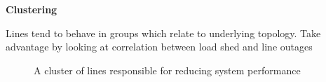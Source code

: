 \textbf{Clustering}

Lines tend to behave in groups which relate to underlying topology.
Take advantage by looking at correlation between load shed and line outages
\begin{figure}
\centering

\caption{A cluster of lines responsible for reducing system performance}
\label{fig:cluster}
\end{figure}

